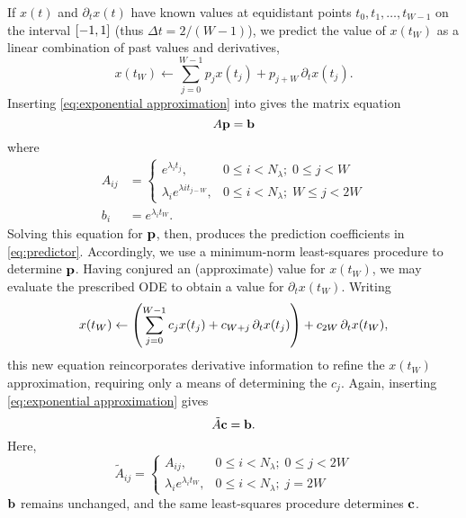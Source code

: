 If $x(t)$ and $\partial_t x(t)$ have known values at equidistant points $t_0, t_1, \ldots, t_{W - 1}$ on the interval $\qty[-1, 1]$ (thus $\Delta t = 2/(W - 1)$), we predict the value of $x(t_W)$ as a linear combination of past values and derivatives,
\begin{equation}
  x(t_W) \leftarrow \sum_{j = 0}^{W - 1} p_j x(t_j) + p_{j + W} \, \partial_t x(t_j).
  \label{eq:predictor}
\end{equation}
Inserting \cref{eq:exponential approximation} into \label{eq:predictor} gives the matrix equation
\begin{equation}
  A \vb{p} = \vb{b}
  \label{eq:predictor vector}
\end{equation}
where
\begin{subequations}
\begin{align}
  A_{ij} &= \begin{cases}
    e^{\lambda_i t_j}, & 0 \leqslant i < N_\lambda; \; 0 \leqslant j < W \\
    \lambda_i e^{\lambda i t_{j - W}}, & 0 \leqslant i < N_\lambda; \; W \leqslant j < 2 W
  \end{cases} \label{eq:a matrix}\\
  b_i &= e^{\lambda_i t_W}. \label{eq:b vector}
\end{align}
\end{subequations}
Solving this equation for $\vb{p}$, then, produces the prediction coefficients in \cref{eq:predictor}.
Accordingly, we use a minimum-norm least-squares procedure to determine $\vb{p}$.
Having conjured an (approximate) value for $x(t_W)$, we may evaluate the prescribed ODE to obtain a value for $\partial_t x(t_W)$.
Writing
\begin{equation}
  x(t_W) \leftarrow \qty(\sum_{j = 0}^{W - 1} c_j x(t_j) + c_{W + j} \, \partial_t x(t_j)) + c_{2W} \, \partial_t x(t_W),
\end{equation}
this new equation reincorporates derivative information to refine the $x(t_W)$ approximation, requiring only a means of determining the $c_j$.
Again, inserting \cref{eq:exponential approximation} gives
\begin{equation}
  \tilde{A} \vb{c} = \vb{b}.
\end{equation}
Here,
\begin{equation}
  \tilde{A}_{ij} = \begin{cases}
    A_{ij}, & 0 \leqslant i < N_\lambda; \; 0 \leqslant j < 2W \\
    \lambda_i e^{\lambda_i t_W}, & 0 \leqslant i < N_\lambda; \; j = 2W
  \end{cases}
\end{equation}
$\vb{b}$ remains unchanged, and the same least-squares procedure determines $\vb{c}$.


